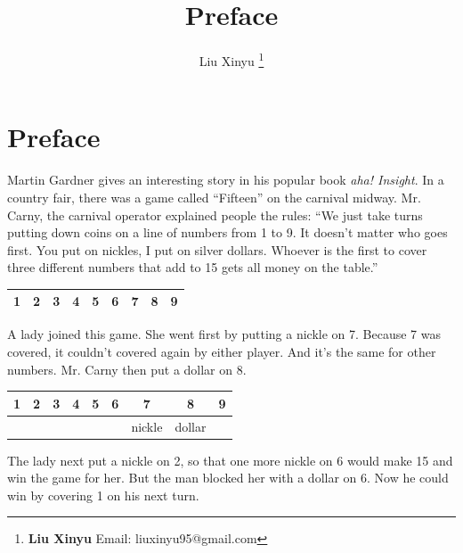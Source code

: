 \documentclass[UTF8]{article}
\begin{document}
\title{Preface}

\author{Liu Xinyu
\thanks{{\bfseries Liu Xinyu} \newline
  Email: liuxinyu95@gmail.com \newline}
  }

\maketitle
\fi


\chapter*{Preface}

Martin Gardner gives an interesting story in his popular book {\em aha! Insight}. In a country fair, there was a game called ``Fifteen'' on the carnival midway. Mr. Carny, the carnival operator explained people the rules: ``We just take turns putting down coins on a line of numbers from 1 to 9. It doesn't matter who goes first. You put on nickles, I put on silver dollars. Whoever is the first to cover three different numbers that add to 15 gets all money on the table.''

\vspace{5mm}
\begin{tabular}{|c|c|c|c|c|c|c|c|c|}
\hline
1 & 2 & 3 & 4 & 5 & 6 & 7 & 8 & 9 \\
\hline
\end{tabular}
\vspace{5mm}

A lady joined this game. She went first by putting a nickle on 7. Because 7 was covered, it couldn't covered again by either player. And it's the same for other numbers. Mr. Carny then put a dollar on 8.

\vspace{5mm}
\begin{tabular}{|c|c|c|c|c|c|c|c|c|}
\hline
1 & 2 & 3 & 4 & 5 & 6 & 7 & 8 & 9 \\
\hline
  &   &   &   &   &   & nickle & dollar & \\
\hline
\end{tabular}
\vspace{5mm}

The lady next put a nickle on 2, so that one more nickle on 6 would make 15 and win the game for her. But the man blocked her with a dollar on 6. Now he could win by covering 1 on his next turn.
\end{document}
